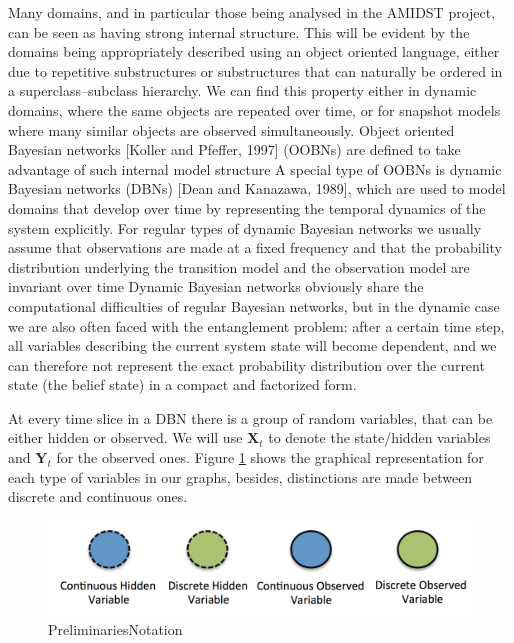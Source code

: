 \cite{russelNorvig2009,JensenNielsen2007}
Many domains, and in particular those being analysed in the AMIDST project, can be seen as having strong internal structure. This will be evident by the domains being appropriately described using an object oriented language, either due to repetitive substructures or substructures that can naturally be ordered in a superclass–subclass hierarchy. We can find this property either in dynamic domains, where the same objects are repeated over time, or for snapshot models where many similar objects are observed simultaneously. Object oriented Bayesian networks [Koller and Pfeffer, 1997] (OOBNs) are defined to take advantage of such internal model structure A special type of OOBNs is dynamic Bayesian networks (DBNs) [Dean and Kanazawa, 1989], which are used to model domains that develop over time by representing the temporal dynamics of the system explicitly. For regular types of dynamic Bayesian networks we usually assume that observations are made at a fixed frequency and that the probability distribution underlying the transition model and the observation model are invariant over time Dynamic Bayesian networks obviously share the computational difficulties of regular Bayesian networks, but in the dynamic case we are also often faced with the entanglement problem: after a certain time step, all variables describing the current system state will become dependent, and we can therefore not represent the exact probability distribution over the current state (the belief state) in a compact and factorized form. 

At every time slice in a DBN there is a group of random variables, that can be either hidden or observed. We will use $\bm X_t$ to denote the state/hidden variables and $\bm Y_t$ for the observed ones. Figure \ref{Figure:PreliminariesNotation} shows the graphical representation for each type of variables in our graphs, besides, distinctions are made between discrete and continuous ones. %

\begin{figure}
\begin{center}
\includegraphics[scale=0.4]{./figures/PreliminariesNotation}
\caption{\label{Figure:PreliminariesNotation}PreliminariesNotation
}
\end{center}
\end{figure}

